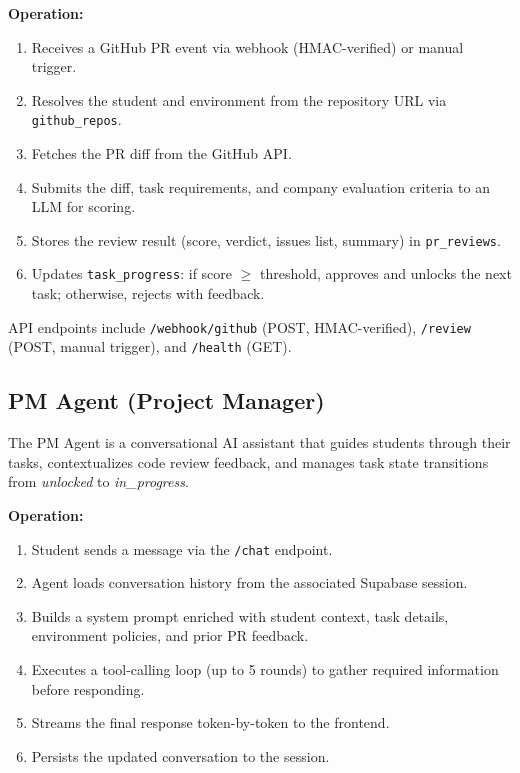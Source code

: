 \documentclass[runningheads]{llncs}
\begin{document}
\noindent\textbf{Operation:}
\begin{enumerate}
    \item Receives a GitHub PR event via webhook (HMAC-verified) or manual trigger.
    \item Resolves the student and environment from the repository URL via \texttt{github\_repos}.
    \item Fetches the PR diff from the GitHub API.
    \item Submits the diff, task requirements, and company evaluation criteria to an LLM for scoring.
    \item Stores the review result (score, verdict, issues list, summary) in \texttt{pr\_reviews}.
    \item Updates \texttt{task\_progress}: if score $\geq$ threshold, approves and unlocks the next task; otherwise, rejects with feedback.
\end{enumerate}

API endpoints include \texttt{/webhook/github} (POST, HMAC-verified), \texttt{/review} (POST, manual trigger), and \texttt{/health} (GET).

\subsection{PM Agent (Project Manager)}

The PM Agent is a conversational AI assistant that guides students through their tasks, contextualizes code review feedback, and manages task state transitions from \textit{unlocked} to \textit{in\_progress}.

\noindent\textbf{Operation:}
\begin{enumerate}
    \item Student sends a message via the \texttt{/chat} endpoint.
    \item Agent loads conversation history from the associated Supabase session.
    \item Builds a system prompt enriched with student context, task details, environment policies, and prior PR feedback.
    \item Executes a tool-calling loop (up to 5 rounds) to gather required information before responding.
    \item Streams the final response token-by-token to the frontend.
    \item Persists the updated conversation to the session.
\end{enumerate}
\end{document}
